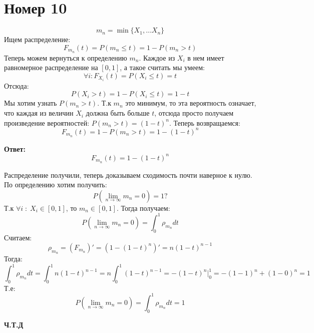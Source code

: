 \documentclass[a4paper,12pt]{article}
\begin{document}
\section*{Номер 10}
\[
m_n = \min \{X_1, \ldots X_n \} 
\]
Ищем распределение:
\[
F_{m_n}(t) = P(m_n \leq t) = 1 - P(m_n > t) 
\]
Теперь можем вернуться к определению $m_n$. Каждое из $X_i$ в нем имеет равномерное распределение на $[0, 1]$, а такое считать мы умеем:
\[
\forall i : F_{X_i}(t) = P(X_i \leq t) = t 
\]
Отсюда:
\[
P(X_i > t) = 1 - P(X_i \leq t) = 1 - t
\]
Мы хотим узнать $P(m_n > t)$. Т.к $m_n$ это минимум, то эта вероятность означает, что каждая из величин  $X_i$ должна быть больше $t$, отсюда просто получаем произведение вероятностей: $P(m_n > t) = (1-t)^n$.
Теперь возвращаемся:
\[
F_{m_n}(t) =  1 - P(m_n > t) =  1 - (1 - t)^n
\]
\begin{center}
\textbf{Ответ: } \[
F_{m_n}(t) = 1 - (1 - t)^n
\]
\end{center}
Распределение получили, теперь доказываем сходимость почти наверное к нулю. По определению хотим получить:
\[
P(\lim_{n \rightarrow \infty} m_n = 0) = 1?
\]
Т.к $\forall i \; : \; X_i \in [0, 1]$, то $m_n \in [0, 1]$. Тогда получаем:
\[
P(\lim_{n \rightarrow \infty} m_n = 0) = \int_0^1 \rho_{m_n} dt 
\] 
Считаем:
\[
\rho_{m_n} = (F_{m_n})' = (1 - (1 - t)^n)' = n(1 -t)^{n-1}
\]
Тогда:
\[
 \int_0^1 \rho_{m_n} dt  =  \int_0^1 n(1-t)^{n-1} = n \int_0^1 (1-t)^{n-1} = -(1-t)^n \Bigg|^1_0 = - (1 - 1)^n + (1 - 0)^n = 1
\]
Т.е:
\[
P(\lim_{n \rightarrow \infty} m_n = 0) = \int_0^1 \rho_{m_n} dt = 1
\]
\begin{center}
\textbf{Ч.Т.Д} 
\end{center}
\end{document}
